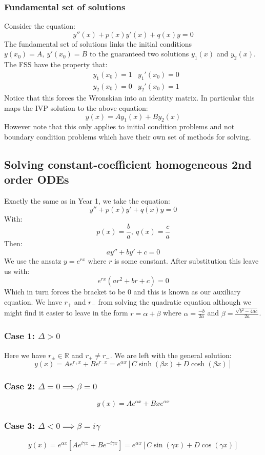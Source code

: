 \documentclass[12pt]{article}
\begin{document}
\subsubsection{Fundamental set of solutions}
Consider the equation:
\[y''(x)+p(x)y'(x)+q(x)y=0\]
The fundamental set of solutions links the initial conditions \(y(x_0)=A,\ y'(x_0)=B\) to the guaranteed two solutions \(y_1(x)\) and \(y_2(x)\). The FSS have the property that:
\begin{align*}
    &y_1(x_0)=1 & y_1'(x_0)=0 \\
    &y_2(x_0)=0 & y_2'(x_0)=1
\end{align*}
Notice that this forces the Wronskian into an identity matrix. In particular this maps the IVP solution to the above equation:
\[y(x)=Ay_1(x)+By_2(x)\]
However note that this only applies to initial condition problems and not boundary condition problems which have their own set of methods for solving.
\subsection{Solving constant-coefficient homogeneous 2nd order ODEs}
Exactly the same as in Year 1, we take the equation:
\[y''+p(x)y'+q(x)y=0\]
With:
\[p(x)=\frac{b}{a},\ q(x)=\frac{c}{a}\]
Then:
\[ay''+by'+c=0\]
We use the ansatz \(y=e^{rx}\) where \(r\) is some constant. After substitution this leave us with:
\[e^{rx}(ar^2+br+c)=0\]
Which in turn forces the bracket to be \(0\) and this is known as our auxiliary equation. We have \(r_+\) and \(r_-\) from solving the quadratic equation although we might find it easier  to leave in the form \(r=\alpha+\beta\) where \(\alpha=\frac{-b}{2a}\) and \(\beta=\frac{\sqrt{b^2-4ac}}{2a}\).
\subsubsection*{Case 1: \(\Delta>0\)}
Here we have \(r_{\pm}\in\mathbb{R}\) and \(r_+\ne r_-\). We are left with the general solution:
\[y(x)=Ae^{r_+x}+Be^{r_-x}=e^{\alpha x}[C\sinh{(\beta x)}+D\cosh{(\beta x)}]\]
\subsubsection*{Case 2: \(\Delta=0\implies\beta=0\)}
\[y(x)=Ae^{\alpha x}+Bxe^{\alpha x}\]
\subsubsection*{Case 3: \(\Delta<0\implies\beta=i\gamma\)}
\[y(x)=e^{\alpha x}[Ae^{i\gamma x}+Be^{-i\gamma x}]=e^{\alpha x}[C\sin{(\gamma x)}+D\cos{(\gamma x)}]\]
\end{document}

